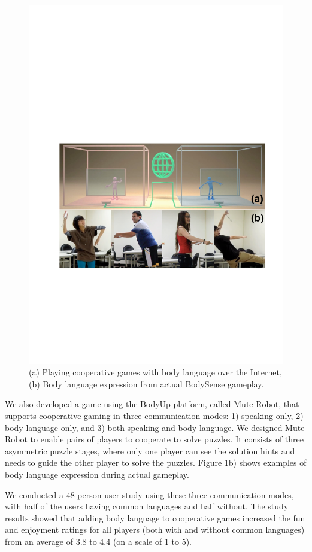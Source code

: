 \begin{figure}[t]
\centering
\includegraphics[width=0.9\columnwidth]{Figures/Topic.pdf}
\caption{(a) Playing cooperative games with body language over the Internet, (b) Body language expression from actual BodySense gameplay.}
\label{fig:Topic}
\end{figure}

We also developed a game using the BodyUp platform, called Mute Robot, that supports cooperative gaming in three communication modes: 1) speaking only, 2) body language only, and 3) both speaking and body language. We designed Mute Robot to enable pairs of players to cooperate to solve puzzles. It consists of three asymmetric puzzle stages, where only one player can see the solution hints and needs to guide the other player to solve the puzzles. Figure 1b) shows examples of body language expression during actual gameplay.

We conducted a 48-person user study using these three communication modes, with half of the users having common languages and half without.
The study results showed that adding body language to cooperative games increased the fun and enjoyment ratings for all players (both with and without common languages) from an average of 3.8 to 4.4 (on a scale of 1 to 5). 

